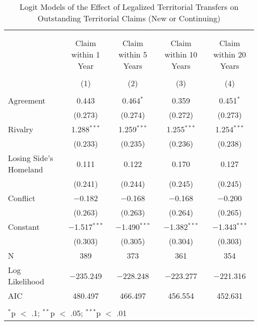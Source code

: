 \documentclass{article}
\begin{document}
\begin{table}[!htbp] \centering 
  \caption{Logit Models of the Effect of Legalized Territorial Transfers on Outstanding Territorial Claims (New or Continuing)} 
  \label{} 
\begin{tabular}{@{\extracolsep{5pt}}lcccc} 
\\[-1.8ex]\hline \\[-1.8ex] 
\\[-1.8ex] & Claim within 1 Year & Claim within 5 Years & Claim within 10 Years & Claim within 20 Years \\ 
\\[-1.8ex] & (1) & (2) & (3) & (4)\\ 
\hline \\[-1.8ex] 
 Agreement & 0.443 & 0.464$^{*}$ & 0.359 & 0.451$^{*}$ \\ 
  & (0.273) & (0.274) & (0.272) & (0.273) \\ 
  Rivalry & 1.288$^{***}$ & 1.259$^{***}$ & 1.255$^{***}$ & 1.254$^{***}$ \\ 
  & (0.233) & (0.235) & (0.236) & (0.238) \\ 
  Losing Side's Homeland & 0.111 & 0.122 & 0.170 & 0.127 \\ 
  & (0.241) & (0.244) & (0.245) & (0.245) \\ 
  Conflict & $-$0.182 & $-$0.168 & $-$0.168 & $-$0.200 \\ 
  & (0.263) & (0.263) & (0.264) & (0.265) \\ 
  Constant & $-$1.517$^{***}$ & $-$1.490$^{***}$ & $-$1.382$^{***}$ & $-$1.343$^{***}$ \\ 
  & (0.303) & (0.305) & (0.304) & (0.303) \\ 
 N & 389 & 373 & 361 & 354 \\ 
Log Likelihood & $-$235.249 & $-$228.248 & $-$223.277 & $-$221.316 \\ 
AIC & 480.497 & 466.497 & 456.554 & 452.631 \\ 
\hline \\[-1.8ex] 
\multicolumn{5}{l}{$^{*}$p $<$ .1; $^{**}$p $<$ .05; $^{***}$p $<$ .01} \\ 
\end{tabular} 
\end{table}
\end{document}
